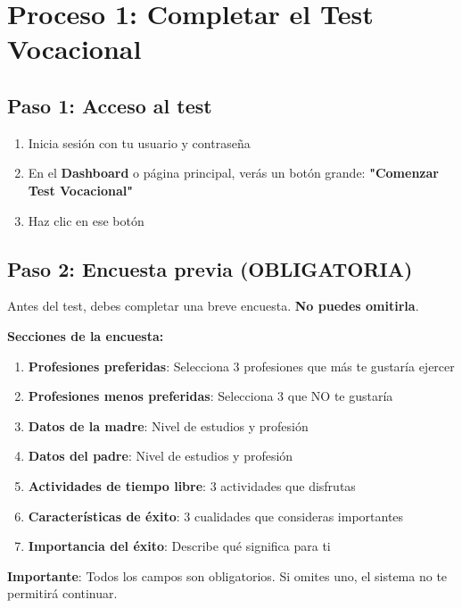 \documentclass[12pt, a4paper]{report}
\begin{document}
\section{Proceso 1: Completar el Test Vocacional}

\subsection{Paso 1: Acceso al test}
\begin{enumerate}
    \item Inicia sesión con tu usuario y contraseña
    \item En el \textbf{Dashboard} o página principal, verás un botón grande: \textbf{"Comenzar Test Vocacional"}
    \item Haz clic en ese botón
\end{enumerate}

\subsection{Paso 2: Encuesta previa (OBLIGATORIA)}
Antes del test, debes completar una breve encuesta. \textbf{No puedes omitirla}.

\textbf{Secciones de la encuesta:}
\begin{enumerate}
    \item \textbf{Profesiones preferidas}: Selecciona 3 profesiones que más te gustaría ejercer
    \item \textbf{Profesiones menos preferidas}: Selecciona 3 que NO te gustaría
    \item \textbf{Datos de la madre}: Nivel de estudios y profesión
    \item \textbf{Datos del padre}: Nivel de estudios y profesión
    \item \textbf{Actividades de tiempo libre}: 3 actividades que disfrutas
    \item \textbf{Características de éxito}: 3 cualidades que consideras importantes
    \item \textbf{Importancia del éxito}: Describe qué significa para ti
\end{enumerate}

\textbf{Importante}: Todos los campos son obligatorios. Si omites uno, el sistema no te permitirá continuar.
\end{document}
